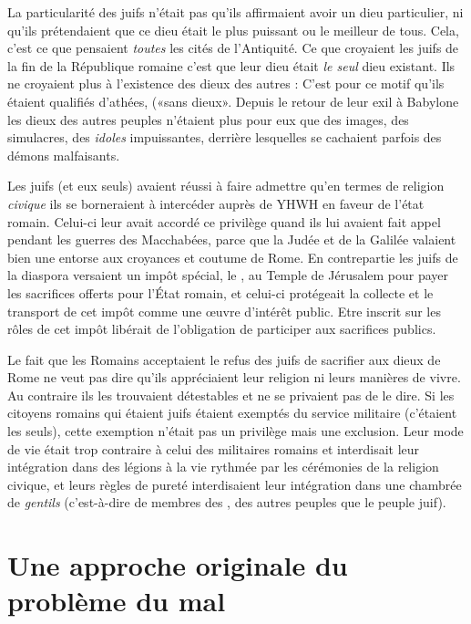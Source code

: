  La particularité des juifs n'était pas qu'ils affirmaient avoir un dieu particulier, ni qu'ils prétendaient que ce dieu était le plus puissant ou le meilleur de tous. Cela, c'est ce que pensaient \emph{toutes} les cités de l'Antiquité. Ce que croyaient les juifs de la fin de la République romaine c'est que leur dieu était \emph{le seul} dieu existant. Ils ne croyaient plus à l'existence des dieux des autres : C'est pour ce motif qu'ils étaient qualifiés d'athées, («{sans dieux}». Depuis le retour de leur exil à Babylone les dieux des autres peuples n'étaient plus pour eux que des images, des simulacres, des \emph{idoles} impuissantes, derrière lesquelles se cachaient parfois des démons malfaisants. 
 
 Les juifs (et eux seuls) avaient réussi à faire admettre qu'en termes de religion \emph{civique} ils se borneraient à intercéder auprès de YHWH en faveur de l'état romain. Celui-ci leur avait accordé ce privilège quand ils lui avaient fait appel pendant les guerres des Macchabées, parce que la Judée et de la Galilée valaient bien une entorse aux croyances et coutume de Rome. En contrepartie les juifs de la diaspora versaient un impôt spécial, le , au Temple de Jérusalem pour payer les sacrifices offerts pour l'État romain, et celui-ci protégeait la collecte et le transport de cet impôt comme une œuvre d'intérêt public. Etre inscrit sur les rôles de cet impôt libérait de l'obligation de participer aux sacrifices publics. 
 
 Le fait que les Romains acceptaient le refus des juifs de sacrifier aux dieux de Rome ne veut pas dire qu'ils appréciaient leur religion ni leurs manières de vivre. Au contraire ils les trouvaient détestables et ne se privaient pas de le dire. Si les citoyens romains qui étaient juifs étaient exemptés du service militaire (c'étaient les seuls), cette exemption n'était pas un privilège mais une exclusion. Leur mode de vie était trop contraire à celui des militaires romains et interdisait leur intégration dans des légions à la vie rythmée par les cérémonies de la religion civique, et leurs règles de pureté interdisaient leur intégration dans une chambrée de \emph{gentils} (c'est-à-dire de membres des , des autres peuples que le peuple juif). 

 

 




\section{Une approche originale du problème du mal}

